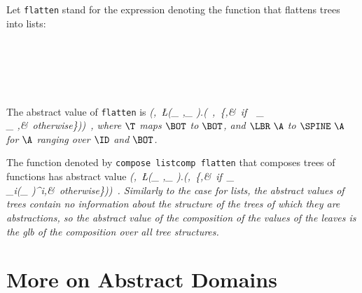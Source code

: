 \documentclass[11pt]{article}
\begin{document}
Let \mbox{\tt flatten} stand for the expression denoting the function that
flattens trees into lists:
\begin{flushleft}
\vspace{-0.0em}\vspace{-0.0em}\\
\vspace{-0.0em}\\
\vspace{-0.0em}\\
\vspace{-0.0em}\\
\vspace{-0.0em}
\end{flushleft}
The abstract value of \mbox{\tt flatten} is
\beqs
\it (\ID,\ \L(\A_{ },\K_{ }).(\T\ \A,\ \left\{\bot,&\it \mbox{\rm\ if}\ \T\ \A_{ }\neq\LBR\ \ID\\
\it \K_{ },&\it \mbox{\rm\ otherwise}\ea\right\}))\ ,
\eeqs
where $\T$ maps $\BOT$ to $\BOT$, and $\LBR~\A$ to $\SPINE~\A$ for $\A$
ranging over $\ID$ and $\BOT$.

The function denoted by \mbox{\tt compose\ listcomp\ flatten} that composes
trees of functions has abstract value
\beqs
\it (\ID,\ \L(\A_{ },\K_{ }).(\ID,\ \left\{\bot,&\it \mbox{\rm\ if}\ \A_{ }\neq\LBR\ \ID\\
\it \glb_{i}(\K_{ })^i,&\it \mbox{\rm\ otherwise}\ea\right\}))\ .
\eeqs
Similarly to the case for lists, the abstract values of trees contain
no information about the structure of the trees of which they are abstractions,
so the abstract value of the composition of the values of the leaves
is the glb of the composition over all tree structures.

\section{More on Abstract Domains}
\end{document}
